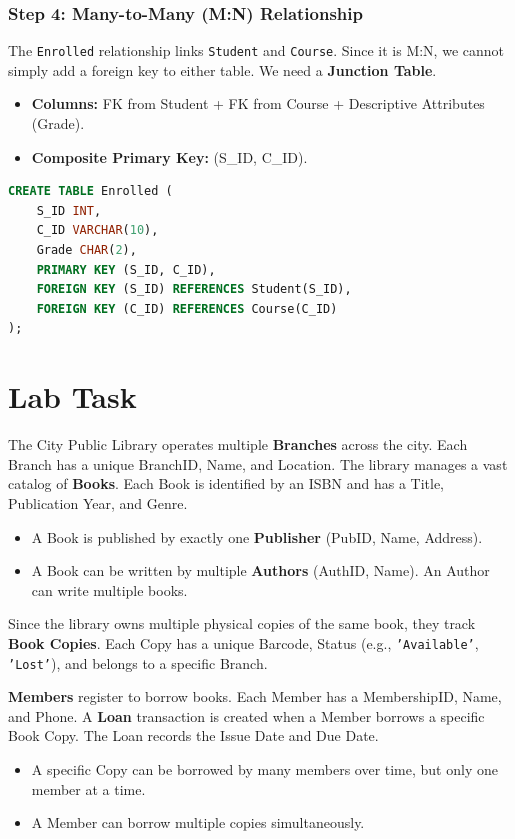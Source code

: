 \documentclass[12pt,a4paper]{article}
\begin{document}
\subsubsection{Step 4: Many-to-Many (M:N) Relationship}
The \texttt{Enrolled} relationship links \texttt{Student} and \texttt{Course}. Since it is M:N, we cannot simply add a foreign key to either table. We need a \textbf{Junction Table}.
\begin{itemize}
    \item \textbf{Columns:} FK from Student + FK from Course + Descriptive Attributes (Grade).
    \item \textbf{Composite Primary Key:} (S\_ID, C\_ID).
\end{itemize}
\begin{lstlisting}[language=SQL]
CREATE TABLE Enrolled (
    S_ID INT,
    C_ID VARCHAR(10),
    Grade CHAR(2),
    PRIMARY KEY (S_ID, C_ID),
    FOREIGN KEY (S_ID) REFERENCES Student(S_ID),
    FOREIGN KEY (C_ID) REFERENCES Course(C_ID)
);
\end{lstlisting}
\newpage

\section{Lab Task}
The City Public Library operates multiple \textbf{Branches} across the city. Each Branch has a unique BranchID, Name, and Location.
The library manages a vast catalog of \textbf{Books}. Each Book is identified by an ISBN and has a Title, Publication Year, and Genre.
\begin{itemize}
    \item A Book is published by exactly one \textbf{Publisher} (PubID, Name, Address).
    \item A Book can be written by multiple \textbf{Authors} (AuthID, Name). An Author can write multiple books.
\end{itemize}

Since the library owns multiple physical copies of the same book, they track \textbf{Book Copies}. Each Copy has a unique Barcode, Status (e.g., \texttt{'Available'}, \texttt{'Lost'}), and belongs to a specific Branch.

\textbf{Members} register to borrow books. Each Member has a MembershipID, Name, and Phone.
A \textbf{Loan} transaction is created when a Member borrows a specific Book Copy. The Loan records the Issue Date and Due Date.
\begin{itemize}
    \item A specific Copy can be borrowed by many members over time, but only one member at a time.
    \item A Member can borrow multiple copies simultaneously.
\end{itemize}
\end{document}
